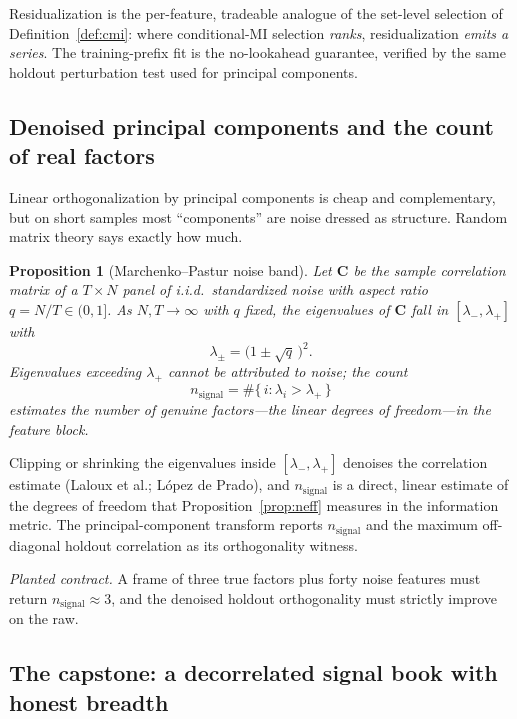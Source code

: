 \documentclass[11pt,a4paper]{article}
\theoremstyle{definition}
\theoremstyle{plain}
\newtheorem{proposition}{Proposition}[section]
\begin{document}
Residualization is the per-feature, tradeable analogue of the set-level selection of
Definition~\ref{def:cmi}: where conditional-MI selection \emph{ranks}, residualization \emph{emits a
series}. The training-prefix fit is the no-lookahead guarantee, verified by the same holdout
perturbation test used for principal components.

\subsection{Denoised principal components and the count of real factors}

Linear orthogonalization by principal components is cheap and complementary, but on short samples
most ``components'' are noise dressed as structure. Random matrix theory says exactly how much.

\begin{proposition}[Marchenko--Pastur noise band]
\label{prop:mp}
Let $\mathbf{C}$ be the sample correlation matrix of a $T\times N$ panel of i.i.d.\ standardized
noise with aspect ratio $q=N/T\in(0,1]$. As $N,T\to\infty$ with $q$ fixed, the eigenvalues of
$\mathbf{C}$ fall in $[\lambda_-,\lambda_+]$ with
\[
   \lambda_{\pm} = \big(1 \pm \sqrt{q}\,\big)^2 .
\]
Eigenvalues exceeding $\lambda_+$ cannot be attributed to noise; the count
\[
   n_{\text{signal}} = \#\{\, i : \lambda_i > \lambda_+ \,\}
\]
estimates the number of genuine factors---the linear degrees of freedom---in the feature block.
\end{proposition}

Clipping or shrinking the eigenvalues inside $[\lambda_-,\lambda_+]$ denoises the correlation
estimate (Laloux et al.; L\'opez de Prado), and $n_{\text{signal}}$ is a direct, linear estimate of
the degrees of freedom that Proposition~\ref{prop:neff} measures in the information metric. The
principal-component transform reports $n_{\text{signal}}$ and the maximum off-diagonal holdout
correlation as its orthogonality witness.

\noindent\emph{Planted contract.} A frame of three true factors plus forty noise features must
return $n_{\text{signal}}\approx 3$, and the denoised holdout orthogonality must strictly improve on
the raw.

\subsection{The capstone: a decorrelated signal book with honest breadth}
\end{document}
